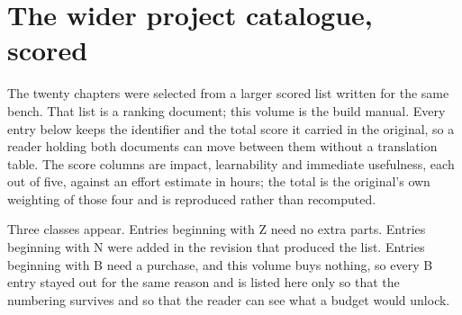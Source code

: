 \section{The wider project catalogue, scored}

The twenty chapters were selected from a larger scored list written for the same
bench. That list is a ranking document; this volume is the build manual. Every
entry below keeps the identifier and the total score it carried in the original,
so a reader holding both documents can move between them without a translation
table. The score columns are impact, learnability and immediate usefulness, each
out of five, against an effort estimate in hours; the total is the original's own
weighting of those four and is reproduced rather than recomputed.

Three classes appear. Entries beginning with Z need no extra parts. Entries
beginning with N were added in the revision that produced the list. Entries
beginning with B need a purchase, and this volume buys nothing, so every B entry
stayed out for the same reason and is listed here only so that the numbering
survives and so that the reader can see what a budget would unlock.

